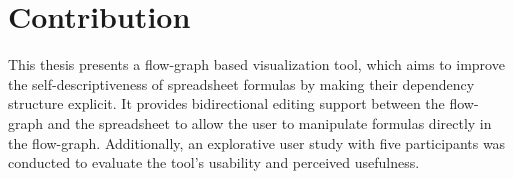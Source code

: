 \section{Contribution}
This thesis presents a flow-graph based visualization tool, which aims to improve the self-descriptiveness of spreadsheet formulas by making their dependency structure explicit. It provides bidirectional editing support between the flow-graph and the spreadsheet to allow the user to manipulate formulas directly in the flow-graph. Additionally, an explorative user study with five participants was conducted to evaluate the tool's usability and perceived usefulness.